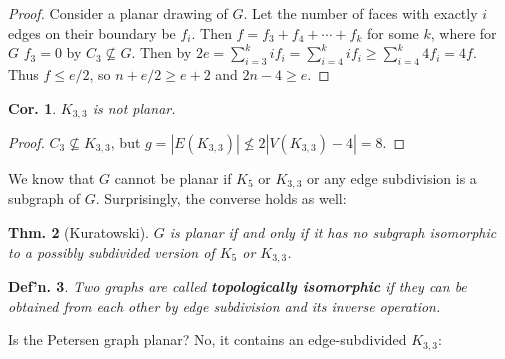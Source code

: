\documentclass[12pt, a4paper]{book}
\newtheorem{theorem}{Thm.}[section]
\newtheorem{definition}[theorem]{Def'n.}
\newtheorem{corollary}[theorem]{Cor.}
\theoremstyle{nonumberplain}
\newtheorem{proof}{Proof}
\begin{document}
\begin{proof}
    Consider a planar drawing of $G$.
    Let the number of faces with exactly $i$ edges on their boundary be $f_i$.
    Then $f=f_3+f_4+\cdots+f_k$ for some $k$, where for $G$ $f_3=0$ by $C_3\not\subseteq G$.
    Then by $2e=\sum\limits_{i=3}^k if_i=\sum\limits_{i=4}^kif_i\geq\sum\limits_{i=4}^k 4f_i=4f$.
    Thus $f\leq e/2$, so $n+e/2\geq e+2$ and $2n-4\geq e$.
\end{proof}
\begin{corollary}
    $K_{3,3}$ is not planar.
\end{corollary}
\begin{proof}
    $C_3\not\subseteq K_{3,3}$, but $g=|E(K_{3,3})|\not\leq 2|V(K_{3,3})-4|=8$.
\end{proof}
We know that $G$ cannot be planar if $K_5$ or $K_{3,3}$ or any edge subdivision is a subgraph of $G$.
Surprisingly, the converse holds as well:
\begin{theorem}[Kuratowski]
    $G$ is planar if and only if it has no subgraph isomorphic to a possibly subdivided version of $K_5$ or $K_{3,3}$.
\end{theorem}
\begin{definition}
    Two graphs are called \textbf{topologically isomorphic} if they can be obtained from each other by edge subdivision and its inverse operation.
\end{definition}
Is the Petersen graph planar?
No, it contains an edge-subdivided $K_{3,3}$:
\begin{center}
\end{center}
\end{document}
